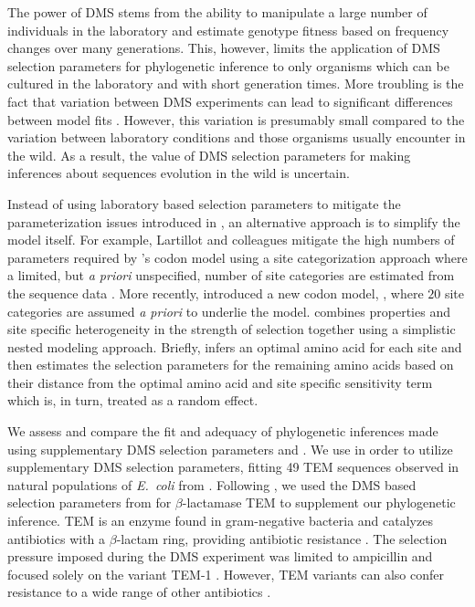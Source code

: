 The power of DMS stems from the ability to manipulate a large number of individuals in the laboratory and estimate genotype fitness based on frequency changes over many generations.
This, however, limits the application of DMS selection parameters for phylogenetic inference to only organisms which can be cultured in the laboratory and with short generation times.
More troubling is the fact that variation between DMS experiments can lead to significant differences between model fits \citep{hilton2017}.
However, this variation is presumably small compared to the variation between laboratory conditions and those organisms usually encounter in the wild.
As a result, the value of DMS selection parameters for making inferences about sequences evolution in the wild is uncertain.

Instead of using laboratory based selection parameters to mitigate the parameterization issues introduced in \hb, an alternative approach is to simplify the model itself.
For example, Lartillot and colleagues mitigate the high numbers of  parameters required by \hb's codon model using a site categorization approach where a limited, but \emph{a priori} unspecified, number of site categories are estimated from the sequence data \citep{LartillotAndPhilippe2004,le2008,RodrigueEtAl2008,RodrigueAndLartillot2014}.
More recently, \citep{beaulieu2019} introduced a new codon model, \selac, where $20$ site categories are assumed \emph{a priori} to underlie the \hb model.
\selac combines \PC properties and site specific heterogeneity in the strength of selection together using a simplistic nested modeling approach.
Briefly, \selac infers an optimal amino acid for each site and then estimates the selection parameters for the remaining amino acids based on their \PC distance from the optimal amino acid and site specific sensitivity term which is, in turn, treated as a random effect.

We assess and compare the fit and adequacy of phylogenetic inferences made using supplementary DMS selection parameters and \selac. 
We use \phydms \citep{hilton2017} in order to utilize supplementary DMS selection parameters, fitting 49 TEM sequences observed in natural populations of \emph{E.~coli} from \citet{bloom2017}.
Following \citep{bloom2017, hilton2017}, we used the DMS based selection parameters from \citet{stiffler2016} for $\beta$-lactamase TEM to supplement our phylogenetic inference.
TEM is an enzyme found in gram-negative bacteria and catalyzes antibiotics with a $\beta$-lactam ring, providing antibiotic resistance \citep{Neu1969}.
The selection pressure imposed during the DMS experiment was limited to ampicillin and focused solely on the variant TEM-1 \citep{stiffler2016}.
However, TEM variants can also confer resistance to a wide range of other antibiotics \citep{sougakoff1988,sougakoff1989,goussard1991,mabilat1992,chanal1992,brun1994}.

